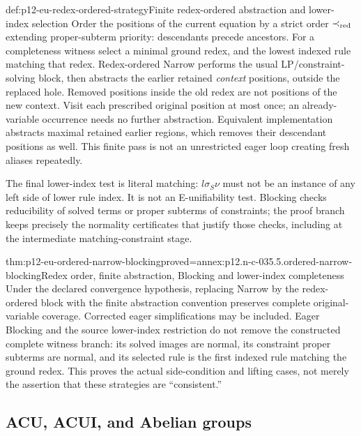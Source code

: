 \begin{hbdefinition}{def:p12-eu-redex-ordered-strategy}{Finite redex-ordered abstraction and lower-index selection}
Order the positions of the current equation by a strict order
\(\prec_{\rm red}\) extending proper-subterm priority: descendants
precede ancestors. For a completeness witness select a minimal
ground redex, and the lowest indexed rule matching that redex.
Redex-ordered Narrow performs the usual LP/constraint-solving block,
then abstracts the earlier retained \emph{context} positions, outside
the replaced hole. Removed positions inside the old redex are not
positions of the new context. Visit each prescribed original position
at most once; an already-variable occurrence needs no further abstraction.
Equivalent implementation abstracts maximal retained earlier regions,
which removes their descendant positions as well. This finite pass is
not an unrestricted eager loop creating fresh aliases repeatedly.

The final lower-index test is literal matching:
\(l\sigma_S\nu\) must not be an instance of any left side of
lower rule index. It is not an E-unifiability test. Blocking checks
reducibility of solved terms or proper subterms of constraints; the
proof branch keeps precisely the normality certificates that justify
those checks, including at the intermediate matching-constraint stage.
\cite[\S4.4.3--4.4.4, pp.~501--503]{BaaderSnyder2001}
\end{hbdefinition}

\begin{hbtheorem}{thm:p12-eu-ordered-narrow-blocking}{proved=annex:p12.n-c-035.5.ordered-narrow-blocking}{Redex order, finite abstraction, Blocking and lower-index completeness}
Under the declared convergence hypothesis, replacing Narrow by the
redex-ordered block with the finite abstraction convention preserves
complete original-variable coverage. Corrected eager simplifications
may be included. Eager Blocking and the source lower-index restriction
do not remove the constructed complete witness branch: its solved
images are normal, its constraint proper subterms are normal, and its
selected rule is the first indexed rule matching the ground redex.
This proves the actual side-condition and lifting cases, not merely
the assertion that these strategies are ``consistent.''
\end{hbtheorem}

\subsection{ACU, ACUI, and Abelian groups}

